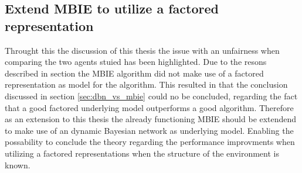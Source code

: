 \subsection{Extend MBIE to utilize a factored representation }
Throught this the discussion of this thesis the issue with an unfairness when comparing the two agents stuied has been highlighted. Due to the resons described in section  the MBIE algorithm did not make use of a factored representation as model for the algorithm. This resulted in that the conclusion discussed in section \ref{sec:dbn_vs_mbie} could no be concluded, regarding the fact that a good factored underlying model outperforms a good algorithm. Therefore as an extension to this thesis the already functioning MBIE should be extendend to make use of an dynamic Bayesian network as underlying model. Enabling the possability to conclude the theory regarding the performance improvments when utilizing a factored representations when the structure of the environment is known.